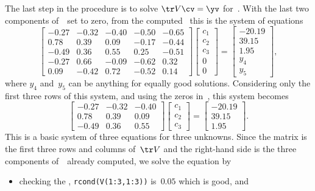 \begin{example}
\begin{solution}
\begin{enumerate}
The last step in the procedure is to solve \(\tr V\cv=\yv\) for~\cv. With the last two components of~\cv\ set to zero, from the computed \svd\ this is the system of equations \twodp
\begin{equation*}
\begin{bmatrix} -0.27&-0.32&-0.40&-0.50&-0.65
\\0.78&0.39&0.09&-0.17&-0.44
\\-0.49&0.36&0.55&0.25&-0.51
\\-0.27&0.66&-0.09&-0.62&0.32
\\0.09&-0.42&0.72&-0.52&0.14 \end{bmatrix}
\begin{bmatrix} c_1\\c_2\\c_3\\0\\0 \end{bmatrix}
=\begin{bmatrix} -20.19\\39.15\\1.95\\y_4\\y_5 \end{bmatrix},
\end{equation*}
where \(y_4\) and~\(y_5\) can be anything for equally good solutions.
Considering only the first three rows of this system, and using the zeros in~\cv, this system becomes
\begin{equation*}
\begin{bmatrix} -0.27&-0.32&-0.40
\\0.78&0.39&0.09
\\-0.49&0.36&0.55 \end{bmatrix}
\begin{bmatrix} c_1\\c_2\\c_3 \end{bmatrix}
=\begin{bmatrix} -20.19\\39.15\\1.95 \end{bmatrix}.
\end{equation*}
This is a basic system of three equations for three unknowns.
Since the matrix is the first three rows and columns of~\(\tr V\) and the right-hand side is the three components of~\yv\ already computed,  we solve the equation by 
\begin{itemize}
\item  checking the , \verb|rcond(V(1:3,1:3))| is~\(0.05\) which is good, and

\end{itemize}
\end{enumerate}
\end{solution}
\end{example}
